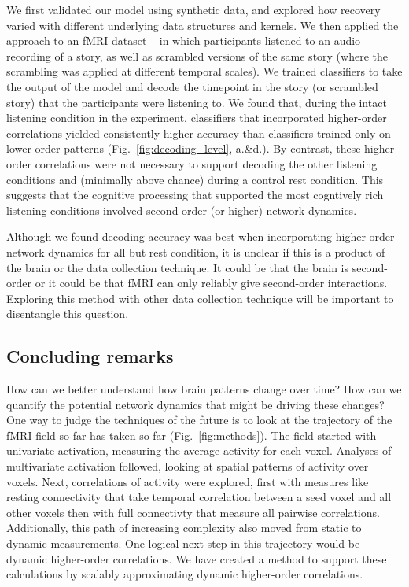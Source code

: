 We first validated our model using synthetic data, and explored how
recovery varied with different underlying data structures and kernels.   We then 
applied the approach to an fMRI dataset
~\citep{SimoEtal16} in which participants listened to an audio
recording of a story, as well as scrambled versions of the same story
(where the scrambling was applied at different temporal scales).  We
trained classifiers to take the output of the model and decode the
timepoint in the story (or scrambled story) that the participants were
listening to. We found that, during the intact listening condition in the
experiment, classifiers that incorporated higher-order correlations
yielded consistently higher accuracy than classifiers trained only on
lower-order patterns (Fig.~\ref{fig:decoding_level},  a.\&d.).  By contrast, these
higher-order correlations were not necessary to support decoding the other
listening conditions and (minimally
above chance) during a control rest condition.  This suggests
that the cognitive processing that supported the most cogntively rich listening conditions
involved second-order (or higher) network dynamics.

Although we found decoding accuracy was best when incorporating
higher-order network dynamics for all but rest
  condition, it is unclear if this is a product of the brain or the
  data collection technique.  It could be that the brain is
  second-order or it could be that fMRI can
  only reliably give second-order interactions. Exploring this method
  with other data collection technique will be important to
  disentangle this question.



  \subsection*{Concluding remarks}

How can we better understand how brain patterns change over
time? How can we quantify the potential network dynamics that might be
driving these changes? One way to judge the techniques of the future is
to look at the trajectory of the fMRI field so far has taken so far
(Fig.~\ref{fig:methods}).  The field started with 
univariate activation, measuring the average activity for each voxel.
Analyses of multivariate activation followed, looking at spatial patterns of
activity over voxels. Next, correlations of activity were explored, first
with measures like resting connectivity that take temporal correlation
between a seed voxel and all other voxels then with full connectivty
that measure all pairwise correlations.  Additionally, this path of increasing
complexity also moved from static to dynamic measurements.  One
logical next step in this trajectory would be dynamic higher-order
correlations. We have created a method 
to support these calculations by scalably approximating dynamic higher-order
correlations.  







